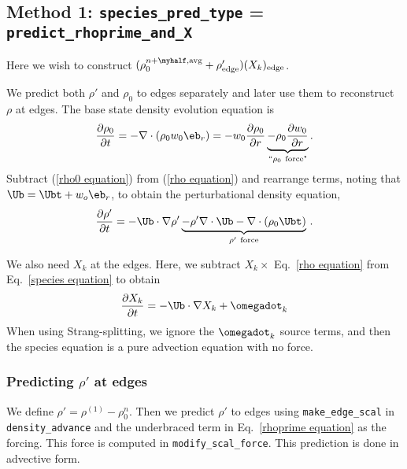 \subsection{Method 1: {\tt species\_pred\_type} = {\tt predict\_rhoprime\_and\_X}}

Here we wish to construct $(\rho_0^{n+\myhalf,{\rm avg}}        
+ \rho'_\mathrm{edge})(X_k)_\mathrm{edge}$.

We predict both $\rho'$ and $\rho_0$ to edges separately and later use them to 
reconstruct $\rho$ at edges.  The base state density evolution equation is
\begin{equation}
\frac{\partial\rho_0}{\partial t} = -\nabla\cdot(\rho_0 w_0 \eb_r) = 
-w_0\frac{\partial\rho_0}{\partial r} 
\underbrace{-\rho_0\frac{\partial w_0}{\partial r}}_{``\rho_0 ~ \text{force"}}.
\label{rho0 equation}
\end{equation}
Subtract (\ref{rho0 equation}) from (\ref{rho equation}) and rearrange
terms, noting that $\Ub = \Ubt + w_o\eb_r$, to obtain the
perturbational density equation,
\begin{equation}
\frac{\partial\rho'}{\partial t} = -\Ub\cdot\nabla\rho' \underbrace{- \rho'\nabla\cdot\Ub 
- \nabla\cdot(\rho_0\Ubt)}_{\rho' ~ \text{force}} \, .
\label{rhoprime equation}
\end{equation}

We also need $X_k$ at the edges.  Here, we subtract $X_k \times$
Eq.~\ref{rho equation} from Eq.~\ref{species equation} to obtain
\begin{equation}
\frac{\partial X_k}{\partial t} = -\Ub \cdot \nabla X_k + \omegadot_k
\end{equation}
When using Strang-splitting, we ignore the $\omegadot_k$ source terms, and
then the species equation is a pure advection equation with no force.

\subsubsection{Predicting $\rho'$ at edges}
We define $\rho' = \rho^{(1)} - \rho_0^n$.  Then we predict $\rho'$ to
edges using {\tt make\_edge\_scal} in {\tt density\_advance} and the
underbraced term in Eq.~\ref{rhoprime equation} as the forcing.  This
force is computed in {\tt modify\_scal\_force}.  This prediction is
done in advective form.

